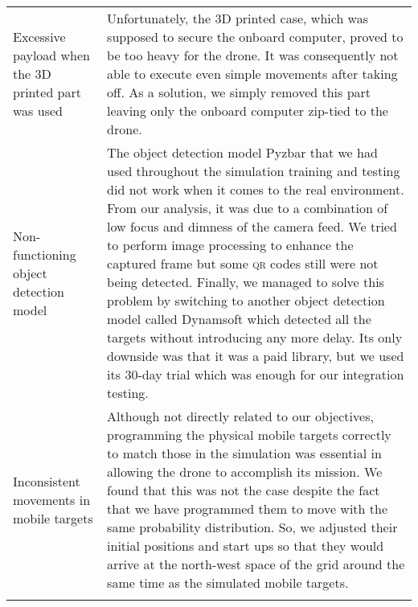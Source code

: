 \documentclass[../main.tex]{subfiles}
\begin{document}
\begin{center}
\begin{xltabular}{\textwidth}{ p{4cm} X }
        \raggedright Excessive payload when the 3D printed part was used
        & 
        Unfortunately, the 3D printed case, which was supposed to
        secure the onboard computer, proved to be too heavy for the
        drone.
        It was consequently not able to execute even simple movements
        after taking off.
        As a solution, we simply removed this part leaving only the
        onboard computer zip-tied to the drone.
        \\ \addlinespace

        \raggedright Non-functioning object detection model 
        & 
        The object detection model Pyzbar that we had used throughout
        the simulation training and testing did not work when it comes
        to the real environment.
        From our analysis, it was due to a combination of low focus
        and dimness of the camera feed.
        We tried to perform image processing to enhance the captured
        frame but some \textsc{qr} codes still were not being
        detected.
        Finally, we managed to solve this problem by switching to
        another object detection model called Dynamsoft which detected
        all the targets without introducing any more delay.
        Its only downside was that it was a paid library, but we used
        its 30-day trial which was enough for our integration testing.
        \\ \addlinespace

        \raggedright Inconsistent movements in mobile targets 
        & 
        Although not directly related to our objectives, programming
        the physical mobile targets correctly to match those in the
        simulation was essential in allowing the drone to accomplish
        its mission.
        We found that this was not the case despite the fact that we
        have programmed them to move with the same probability
        distribution. 
        So, we adjusted their initial positions and start ups so that
        they would arrive at the north-west space of the grid around
        the same time as the simulated mobile targets.
        \\ \addlinespace

        \bottomrule		
    \end{xltabular}
\end{center}
 
\end{document}
